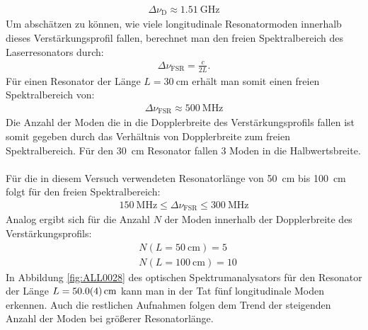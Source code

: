 \documentclass[11pt, a4paper]{article}
\numberwithin{equation}{section}
\begin{document}
\begin{align}
	\Delta \nu_\mathrm{D} \approx \SI{1.51}{\giga\hertz}
\end{align}
Um abschätzen zu können, wie viele longitudinale Resonatormoden innerhalb dieses Verstärkungsprofil fallen, berechnet man den freien Spektralbereich des Laserresonators durch:
\begin{align}
	\Delta \nu_\mathrm{FSR} = \frac{c}{2 L} \text{.}
\end{align}
Für einen Resonator der Länge $L = \SI{30}{\centi\metre}$ erhält man somit einen freien Spektralbereich von:
\begin{align}
	\Delta \nu_\mathrm{FSR} \approx \SI{500}{\mega\hertz}
\end{align}
Die Anzahl der Moden die in die Dopplerbreite des Verstärkungsprofils fallen ist somit gegeben durch das Verhältnis von Dopplerbreite zum freien Spektralbereich.
Für den \SI{30}{\centi\metre} Resonator fallen \num{3} Moden in die Halbwertsbreite.\\
\\
Für die in diesem Versuch verwendeten Resonatorlänge von \SI{50}{\centi\metre} bis \SI{100}{\centi\metre} folgt für den freien Spektralbereich:
\begin{align}
\SI{150}{\mega\hertz} \le \Delta \nu_\mathrm{FSR} \le \SI{300}{\mega\hertz}
\end{align}
Analog ergibt sich für die Anzahl $N$ der Moden innerhalb der Dopplerbreite des Verstärkungsprofils:
\begin{align}
	&N(L = \SI{50}{\centi\metre}) = 5 \\
	&N(L = \SI{100}{\centi\metre}) = 10
\end{align}
In Abbildung \ref{fig:ALL0028} des optischen Spektrumanalysators für den Resonator der Länge $L = \SI{50 +- 0.4}{\centi\metre}$ kann man in der Tat fünf longitudinale Moden erkennen.
Auch die restlichen Aufnahmen folgen dem Trend der steigenden Anzahl der Moden bei größerer Resonatorlänge.
\end{document}
